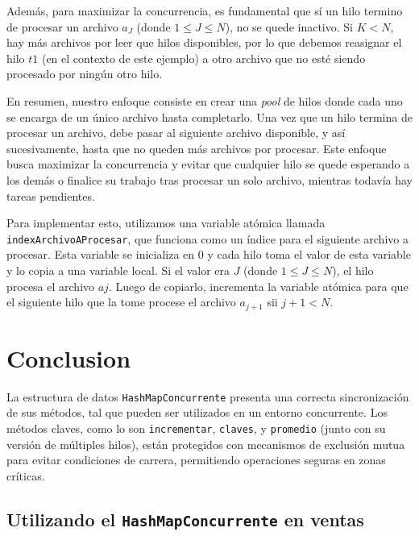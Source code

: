 \documentclass[a4paper]{article}
\begin{document}
    Además, para maximizar la concurrencia, es fundamental que sí un hilo termino de procesar un archivo \( a_J \) (donde \( 1 \leq J \leq N \)), no se quede inactivo. Si \( K < N \), hay más archivos por leer que hilos disponibles, por lo que debemos reasignar el hilo $t1$ (en el contexto de este ejemplo) a otro archivo que no esté siendo procesado por ningún otro hilo.

    En resumen, nuestro enfoque consiste en crear una \textit{pool} de hilos donde cada uno se encarga de un único archivo hasta completarlo. Una vez que un hilo termina de procesar un archivo, debe pasar al siguiente archivo disponible, y así sucesivamente, hasta que no queden más archivos por procesar. Este enfoque busca maximizar la concurrencia y evitar que cualquier hilo se quede esperando a los demás o finalice su trabajo tras procesar un solo archivo, mientras todavía hay tareas pendientes.

    Para implementar esto, utilizamos una variable atómica llamada
    \\ \texttt{indexArchivoAProcesar}, que funciona como un índice para el siguiente archivo a procesar. Esta variable se inicializa en 0 y cada hilo toma el valor de esta variable y lo copia a una variable local. Si el valor era \( J \) (donde \( 1 \leq J \leq N \)), el hilo procesa el archivo $aj$. Luego de copiarlo, incrementa la variable atómica para que el siguiente hilo que la tome procese el archivo  $a_{j+1}$ sii $j+1 < N$.


    \section{Conclusion}
%
%

    La estructura de datos \texttt{HashMapConcurrente} presenta una correcta sincronización de sus métodos, tal que pueden ser utilizados en un entorno concurrente. Los métodos claves, como lo son \texttt{incrementar}, \texttt{claves}, y \texttt{promedio} (junto con su versión de múltiples hilos), están protegidos con mecanismos de exclusión mutua para evitar condiciones de carrera, permitiendo operaciones seguras en zonas críticas.

    \subsection{Utilizando el \texttt{HashMapConcurrente} en ventas}
\end{document}

